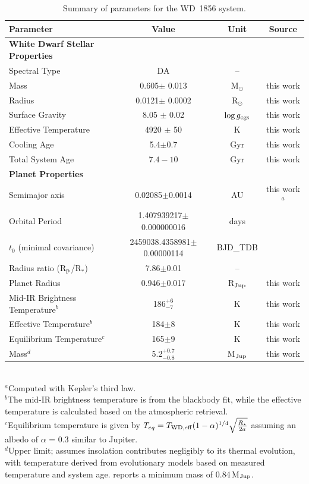 \documentclass[twocolumn]{aastex631}
\begin{document}
\begin{table}
\centering
\caption{ Summary of parameters for the WD~1856 system.} \label{parameters}
\medskip
\begin{tabular}{lccc}
\hline
Parameter & Value & Unit & Source \\
\hline
\textbf{White Dwarf Stellar Properties} &  &  \\
Spectral Type & DA & -- & \cite{2021AJ....162..296X}\\
Mass & 0.605$\pm$ 0.013 & M$_\odot$ & this work\\
Radius & 0.0121$\pm$ 0.0002 & R$_\odot$  & this work\\
Surface Gravity & 8.05 $\pm$ 0.02 & $\log{g_{\rm cgs}}$ & this work\\
Effective Temperature & 4920 $\pm$ 50 & K & this work\\
Cooling Age & 5.4$\pm$0.7  & Gyr & this work\\
Total System Age & $7.4-10$ & Gyr & this work\\
\textbf{Planet Properties}  & &  \\
Semimajor axis & 0.02085$\pm$0.0014 & AU &  this work$^{a}$\\
Orbital Period & 1.407939217$\pm$0.000000016 & days & \cite{2023MNRAS.521.4679K}\\
$t_0$ (minimal covariance) & 2459038.4358981$\pm$0.00000114 & BJD\_TDB & \cite{2023MNRAS.521.4679K}\\
Radius ratio (R$_{\rm p}$/R$_{*}$) & 7.86$\pm$0.01 & -- & \cite{2021AJ....162..296X} \\
Planet Radius  & 0.946$\pm$0.017 & R$_{\rm Jup}$ &  this work \\
Mid-IR Brightness Temperature$^{b}$ & 186$^{+6}_{-7}$ & K &  this work\\
Effective Temperature$^{b}$  & 184$\pm$8 & K &  this work\\
Equilibrium Temperature$^{c}$ & 165$\pm$9 & K & this work\\
Mass$^{d}$ & 5.2$^{+0.7}_{-0.8}$ & M$_{\rm Jup}$ & this work\\
\hline
\end{tabular}     \\ 
      $^{a}$Computed with Kepler's third law.\\
      $^{b}$The mid-IR brightness temperature is from the blackbody fit, while the effective temperature is calculated based on the atmospheric retrieval.\\
      $^{c}$Equilibrium temperature is given by $T_{eq}=T_{\rm WD,eff}(1 - \alpha)^{1/4}\sqrt{\frac{R_\star}{2a}}$ assuming an albedo of $\alpha$ = 0.3 similar to Jupiter\citep{1981JGR....86.8705H}.\\
      $^{d}$Upper limit; assumes insolation contributes negligibly to its thermal evolution, with temperature derived from evolutionary models based on measured temperature and system age. \cite{2021AJ....162..296X} reports a minimum mass of 0.84\,M$_{\rm Jup}$.
      \vspace{2mm}
\end{table}
\end{document}
